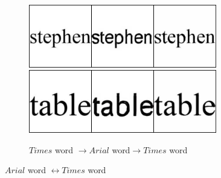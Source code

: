 \documentclass[10pt,twocolumn,letterpaper]{article}
\begin{document}
\begin{figure}[!htb]
\begin{subfigure}[]{0.49\textwidth}
         \vspace{0.3cm}
		 \includegraphics[width=0.9\textwidth]{test_b_2_a_420}\\
		 \vspace{0.3cm}
		 \includegraphics[width=0.9\textwidth]{test_b_2_a_436}\\
		 \caption{$Times$ word $\rightarrow Arial$ word$\rightarrow Times$ word}
         \label{fig:times2arial_word}
     \end{subfigure}

     \caption{$Arial$ word $\leftrightarrow Times$ word}
     \label{fig:arial22times_word}
\end{figure} 
\end{document}
